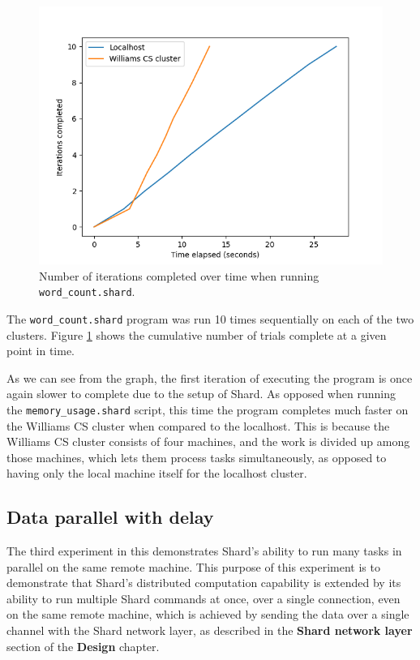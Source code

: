 \documentclass[oneside]{report}
\begin{document}
\begin{figure}[h]
  \begin{center}
    \includegraphics[scale=0.9]{img/experiments/e2_1620960581241.png}
    \caption{Number of iterations completed over time when running \texttt{word\_count.shard}.}
    \label{fig:wordcount}
  \end{center}
\end{figure}

The \texttt{word\_count.shard} program was run 10 times sequentially on each of the two clusters.
Figure \ref{fig:wordcount} shows the cumulative number of trials complete at a given point in time.

As we can see from the graph, the first iteration of executing the program is once again slower to complete due to the setup of Shard.
As opposed when running the \texttt{memory\_usage.shard} script, this time the program completes much faster on the Williams CS cluster when compared to the localhost.
This is because the Williams CS cluster consists of four machines, and the work is divided up among those machines, which lets them process tasks simultaneously, as opposed to having only the local machine itself for the localhost cluster.

\subsection{Data parallel with delay}
The third experiment in this demonstrates Shard's ability to run many tasks in parallel on the same remote machine.
This purpose of this experiment is to demonstrate that Shard's distributed computation capability is extended by its ability to run multiple Shard commands at once, over a single connection, even on the same remote machine, which is achieved by sending the data over a single channel with the Shard network layer, as described in the \textbf{Shard network layer} section of the \textbf{Design} chapter.
\end{document}

